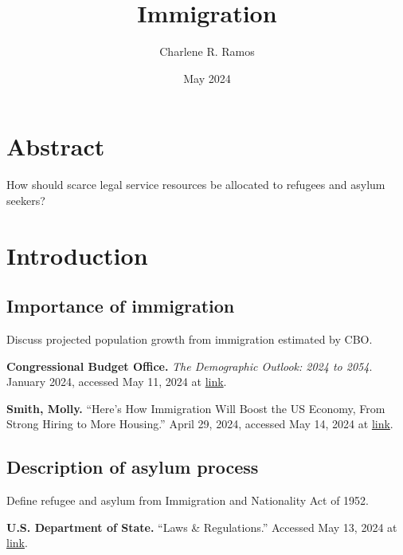 \documentclass{article}
\title{Immigration}
\author{Charlene R. Ramos}
\date{May 2024}
\begin{document}
\maketitle

\section{Abstract} 
How should scarce legal service resources be allocated to refugees and asylum seekers? 

\section{Introduction}

\subsection{Importance of immigration}

Discuss projected population growth from immigration estimated by CBO.\\ 

\begin{hangparas}{.25in}{1}

\textbf{Congressional Budget Office.} \textit{The Demographic Outlook: 2024 to 2054}. January 2024, accessed May 11, 2024 at \href{https://tinyurl.com/37zcmst9}{link}.

\textbf{Smith, Molly.} “Here’s How Immigration Will Boost the US Economy, From Strong Hiring to More Housing.” April 29, 2024, accessed May 14, 2024 at \href{https://www.bloomberg.com/news/articles/2024-04-29/how-immigration-will-boost-the-us-economy-through-strong-hiring-more-housing}{link}.

\end{hangparas}

\subsection{Description of asylum process}

Define refugee and asylum from Immigration and Nationality Act of 1952.\\ 

\begin{hangparas}{.25in}{1}

\textbf{U.S. Department of State.} “Laws \& Regulations.” Accessed May 13, 2024 at \href{https://travel.state.gov/content/travel/en/legal/visa-law0/laws-regulations.html}{link}.\\

\end{hangparas}
\end{document}
